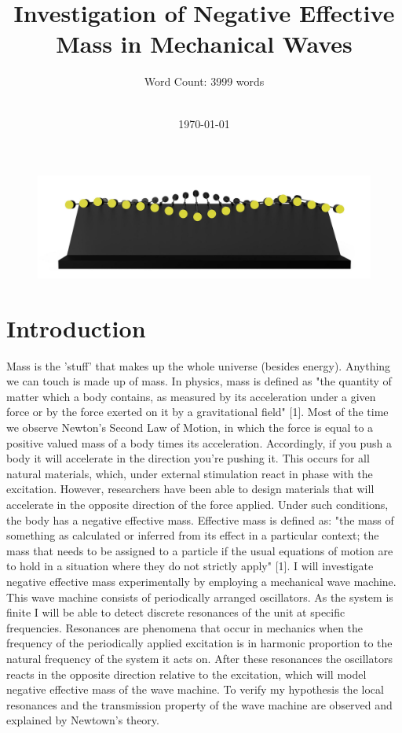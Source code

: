 \documentclass[12pt]{article}
\title{Investigation of Negative Effective Mass in Mechanical Waves}
\author{Word Count: 3999 words\\\\}
\date{\today}
\begin{document}
\maketitle
\begin{figure}[hbt]
	\includegraphics[width=\textwidth]{images/mechanical_wave_machine.jpg}
\end{figure}

\clearpage

\setcounter{page}{2}                    %
\tableofcontents 
\clearpage                       %

\section{Introduction} 
Mass is the 'stuff' that makes up the whole universe (besides energy). Anything we can touch is made up of mass. In physics, mass is defined as "the quantity of matter which a body contains, as measured by its acceleration under a given force or by the force exerted on it by a gravitational field" [1]. Most of the time we observe Newton's Second Law of Motion, in which the force is equal to a positive valued mass of a body times its acceleration. Accordingly, if you push a body it will accelerate in the direction you're pushing it. This occurs for all natural materials, which, under external stimulation react in phase with the excitation. However, researchers have been able to design materials that will accelerate in the opposite direction of the force applied. Under such conditions, the body has a negative effective mass. Effective mass is defined as: "the mass of something as calculated or inferred from its effect in a particular context; the mass that needs to be assigned to a particle if the usual equations of motion are to hold in a situation where they do not strictly apply" [1]. I will investigate negative effective mass experimentally by employing a mechanical wave machine. This wave machine consists of periodically arranged oscillators. As the system is finite I will be able to detect discrete resonances of the unit at specific frequencies. Resonances are phenomena that occur in mechanics when the frequency of the periodically applied excitation is in harmonic proportion to the natural frequency of the system it acts on. After these resonances the oscillators reacts in the opposite direction relative to the excitation, which will model negative effective mass of the wave machine. To verify my hypothesis the local resonances and the transmission property of the wave machine are observed and explained by Newtown's theory.
 
\end{document}
